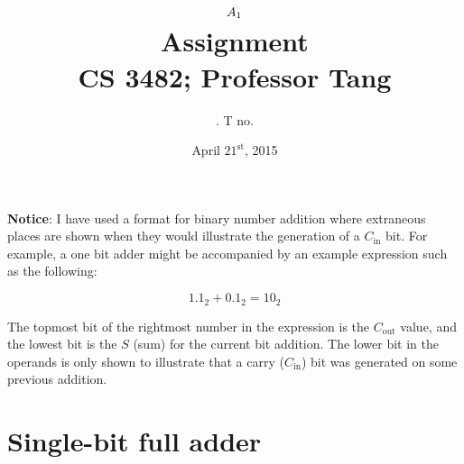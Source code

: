 \documentclass[11pt]{article}
\title{
	$A_{1}$ \\
	{\large Assignment \ass\\
	CS 3482; Professor Tang}
}
\author{
	\name. T no. \tno
}
\date{April $21^{\text{st}}$, 2015}
\begin{document}
\maketitle

{\bf Notice}: I have used a format for binary number addition where extraneous places are shown when they would illustrate the generation of a $C_{\text{in}}$ bit. For example, a one bit adder might be accompanied by an example expression such as the following:

	\[
		1.1_2 + 0.1_2 = 10_2
	\]

	The topmost bit of the rightmost number in the expression is the $C_{\text{out}}$ value, and the lowest bit is the $S$ (sum) for the current bit addition. The lower bit in the operands is only shown to illustrate that a carry ($C_{\text{in}}$) bit was generated on some previous addition.

\section{Single-bit full adder}
\end{document}
